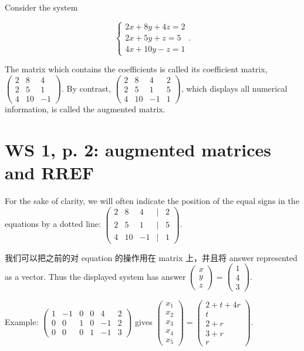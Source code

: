 Consider the system

\[\left\{ \begin{matrix}
{2x + 8y + 4z = 2} \\
{2x + 5y + z = 5} \\
{4x + 10y - z = 1}
\end{matrix} \right..\]

The matrix which contains the coefficients is called its coefficient matrix, \(\begin{pmatrix}
2 & 8 & 4 \\
2 & 5 & 1 \\
4 & 10 & {- 1}
\end{pmatrix}\). By contrast, \(\begin{pmatrix}
2 & 8 & 4 & 2 \\
2 & 5 & 1 & 5 \\
4 & 10 & {- 1} & 1
\end{pmatrix}\), which displays all numerical information, is called the augmented matrix.

\section{WS 1, p. 2: augmented matrices and RREF}

For the sake of clarity, we will often indicate the position of the equal signs in the equations by a dotted line: \(\begin{pmatrix}
2 & 8 & 4 & | & 2 \\
2 & 5 & 1 & | & 5 \\
4 & 10 & {- 1} & | & 1
\end{pmatrix}\).

我们可以把之前的对 equation 的操作用在 matrix 上，并且将 answer represented as a vector. Thus the displayed system has answer \(\begin{pmatrix}
x \\
y \\
z
\end{pmatrix} = \begin{pmatrix}
1 \\
4 \\
3
\end{pmatrix}\).

Example: \(\begin{pmatrix}
1 & {- 1} & 0 & 0 & 4 & 2 \\
0 & 0 & 1 & 0 & {- 1} & 2 \\
0 & 0 & 0 & 1 & {- 1} & 3
\end{pmatrix}\) gives \(\begin{pmatrix}
x_{1} \\
x_{2} \\
x_{3} \\
x_{4} \\
x_{5}
\end{pmatrix} = \begin{pmatrix}
{2 + t + 4r} \\
t \\
{2 + r} \\
{3 + r} \\
r
\end{pmatrix}\).

